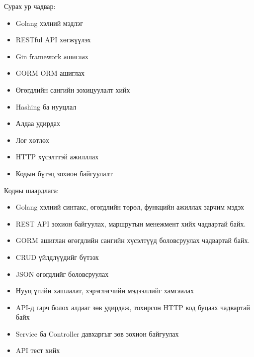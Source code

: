 Сурах ур чадвар:
\begin{itemize}
	\item Golang хэлний мэдлэг 
	\item RESTful API хөгжүүлэх
	\item Gin framework ашиглах
	\item GORM ORM ашиглах
	\item Өгөгдлийн сангийн зохицуулалт хийх
	\item Hashing ба нууцлал
	\item Алдаа удирдах
	\item Лог хөтлөх
	\item HTTP хүсэлттэй ажилллах
	\item Кодын бүтэц зохион байгуулалт
\end{itemize}

Кодны шаардлага:
\begin{itemize}
	\item Golang хэлний синтакс, өгөгдлийн төрөл, функцийн ажиллах зарчим мэдэх 
	\item REST API зохион байгуулах, маршрутын менежмент хийх чадвартай байх.
	\item GORM ашиглан өгөгдлийн сангийн хүсэлтүүд боловсруулах чадвартай байх.
	\item CRUD үйлдлүүдийг бүтээх
	\item JSON өгөгдлийг боловсруулах
	\item Нууц үгийн хашлалат, хэрэглэгчийн мэдээллийг хамгаалах
	\item API-д гарч болох алдааг зөв удирдаж, тохирсон HTTP код буцаах чадвартай байх
	\item Service ба Controller давхаргыг зөв зохион байгуулах
	\item API тест хийх
\end{itemize}
\pagebreak
